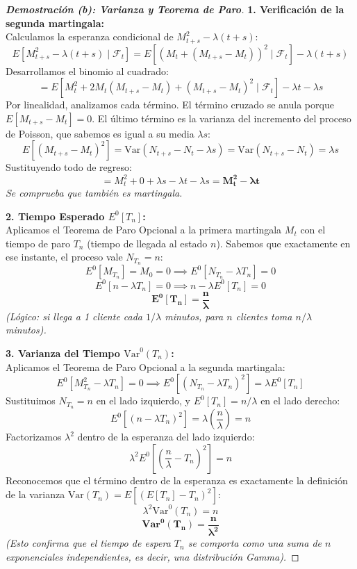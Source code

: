 \documentclass[10pt,a4paper]{article}
\begin{document}
\newpage

\begin{proof}[\textbf{Demostración (b): Varianza y Teorema de Paro}]
    \textbf{1. Verificación de la segunda martingala:} \\
    Calculamos la esperanza condicional de $M_{t+s}^2 - \lambda(t+s)$:
    $$ E[M_{t+s}^2 - \lambda(t+s) \mid \mathcal{F}_t] = E[(M_t + (M_{t+s} - M_t))^2 \mid \mathcal{F}_t] - \lambda(t+s) $$
    Desarrollamos el binomio al cuadrado:
    $$ = E[M_t^2 + 2M_t(M_{t+s} - M_t) + (M_{t+s} - M_t)^2 \mid \mathcal{F}_t] - \lambda t - \lambda s $$
    Por linealidad, analizamos cada término. El término cruzado se anula porque $E[M_{t+s} - M_t] = 0$. El último término es la varianza del incremento del proceso de Poisson, que sabemos es igual a su media $\lambda s$:
    $$ E[(M_{t+s} - M_t)^2] = \text{Var}(N_{t+s} - N_t - \lambda s) = \text{Var}(N_{t+s} - N_t) = \lambda s $$
    Sustituyendo todo de regreso:
    $$ = M_t^2 + 0 + \lambda s - \lambda t - \lambda s = \mathbf{M_t^2 - \lambda t} $$
    \textit{Se comprueba que también es martingala.}

    \vspace{3mm}
    \textbf{2. Tiempo Esperado $E^0[T_n]$:} \\
    Aplicamos el Teorema de Paro Opcional a la primera martingala $M_t$ con el tiempo de paro $T_n$ (tiempo de llegada al estado $n$). Sabemos que exactamente en ese instante, el proceso vale $N_{T_n} = n$:
    $$ E^0[M_{T_n}] = M_0 = 0 \implies E^0[N_{T_n} - \lambda T_n] = 0 $$
    $$ E^0[n - \lambda T_n] = 0 \implies n - \lambda E^0[T_n] = 0 $$
    $$ \mathbf{E^0[T_n] = \frac{n}{\lambda}} $$
    \textit{(Lógico: si llega a 1 cliente cada $1/\lambda$ minutos, para $n$ clientes toma $n/\lambda$ minutos).}

    \vspace{3mm}
    \textbf{3. Varianza del Tiempo $\text{Var}^0(T_n)$:} \\
    Aplicamos el Teorema de Paro Opcional a la segunda martingala:
    $$ E^0[M_{T_n}^2 - \lambda T_n] = 0 \implies E^0[(N_{T_n} - \lambda T_n)^2] = \lambda E^0[T_n] $$
    Sustituimos $N_{T_n} = n$ en el lado izquierdo, y $E^0[T_n] = n/\lambda$ en el lado derecho:
    $$ E^0[(n - \lambda T_n)^2] = \lambda \left(\frac{n}{\lambda}\right) = n $$
    Factorizamos $\lambda^2$ dentro de la esperanza del lado izquierdo:
    $$ \lambda^2 E^0\left[\left(\frac{n}{\lambda} - T_n\right)^2\right] = n $$
    Reconocemos que el término dentro de la esperanza es exactamente la definición de la varianza $\text{Var}(T_n) = E[(E[T_n] - T_n)^2]$:
    $$ \lambda^2 \text{Var}^0(T_n) = n $$
    $$ \mathbf{\text{Var}^0(T_n) = \frac{n}{\lambda^2}} $$
    \textit{(Esto confirma que el tiempo de espera $T_n$ se comporta como una suma de $n$ exponenciales independientes, es decir, una distribución Gamma).}
\end{proof}
\end{document}
